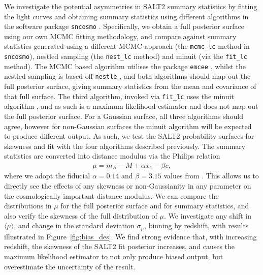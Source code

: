 \documentclass[a4paper,fleqn,usenatbib]{mnras}
\begin{document}
We investigate the potential asymmetries in SALT2 summary statistics by fitting the light curves and obtaining summary statistics using different algorithms in the software package \verb|sncosmo| \citep{Barbary2014}. Specifically, we obtain a full posterior surface using our own MCMC fitting methodology, and compare against summary statistics generated using a different MCMC approach (the \verb|mcmc_lc| method in \verb|sncosmo|), nestled sampling (the \verb|nest_lc| method) and minuit (via the \verb|fit_lc| method). The MCMC based algorithm utilises the package \verb|emcee| \citep{ForemanMackey2013}, whilst the nestled sampling is based off \verb|nestle| \citep{Skilling2004, Barbary2015}, and both algorithms should map out the full posterior surface, giving summary statistics from the mean and covariance of that full surface. The third algorithm, invoked via \verb|fit_lc| uses the minuit algorithm \citep{James1975, minuit2015}, and as such is a maximum likelihood estimator and does not map out the full posterior surface. For a Gaussian surface, all three algorithms should agree, however for non-Gaussian surfaces the minuit algorithm will be expected to produce different output. As such, we test the SALT2 probability surfaces for skewness and fit with the four algorithms described previously. The summary statistics are converted into distance modulus via the Philips relation
\begin{align}
\mu = m_B - M + \alpha x_1 - \beta c,
\end{align}
where we adopt the fiducial $\alpha = 0.14$ and $\beta = 3.15$ values from \citet{BetouleKessler2014}. This allows us to directly see the effects of any skewness or non-Gaussianity in any parameter on the cosmologically important distance modulus. We can compare the distributions in $\mu$ for the full posterior surface and for summary statistics, and also verify the skewness of the full distribution of $\mu$. We investigate any shift in $\langle \mu \rangle$, and change in the standard deviation $\sigma_\mu$, binning by redshift, with results illustrated in Figure~\ref{fig:bias_des}. We find strong evidence that, with increasing redshift, the skewness of the SALT2 fit posterior increases, and causes the maximum likelihood estimator to not only produce biased output, but overestimate the uncertainty of the result.
\end{document}
